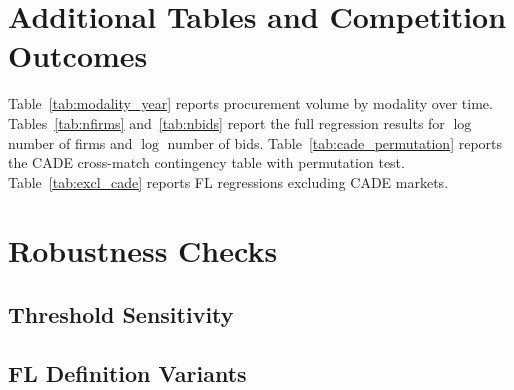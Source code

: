 
\section{Additional Tables and Competition Outcomes} %
\label{app:competition}

Table~\ref{tab:modality_year} reports procurement volume by modality
over time. Tables~\ref{tab:nfirms} and~\ref{tab:nbids} report the
full regression results for $\log$ number of firms and $\log$ number
of bids. Table~\ref{tab:cade_permutation} reports the CADE
cross-match contingency table with permutation test.
Table~\ref{tab:excl_cade} reports FL regressions excluding CADE
markets.











\section{Robustness Checks}
\label{app:robustness}

\subsection{Threshold Sensitivity}

\begin{table}[htbp]
\centering
\caption{Price Coefficient Across IQR Multiplier Thresholds}
\label{tab:threshold}

\end{table}

\subsection{FL Definition Variants}






